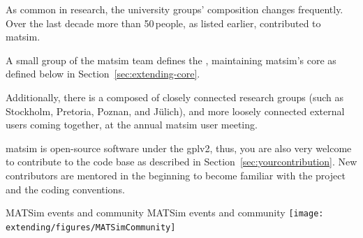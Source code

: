 As common in research, the university groups' composition changes frequently. Over the last decade more than 50\,people, as listed earlier, contributed to \gls{matsim}.

A small group of the \gls{matsim} team defines the , maintaining \gls{matsim}'s core as defined below in Section~\ref{sec:extending-core}.

Additionally, there is a  composed of closely connected research groups (such as Stockholm, Pretoria, Poznan, and Jülich),
and more loosely connected external users coming together, \eg at the annual \gls{matsim} user meeting.   

\gls{matsim} is open-source software under the \gls{gplv2}, thus, you are also very welcome to contribute to the code base as described in Section~\ref{sec:yourcontribution}. New contributors are mentored in the beginning 
to become familiar with the project and the coding conventions. 

%
\createfigure%
{MATSim events and community}%
{MATSim events and community}%
{\label{fig:team}}%
{\texttt{[image: extending/figures/MATSimCommunity]}}%
{}

